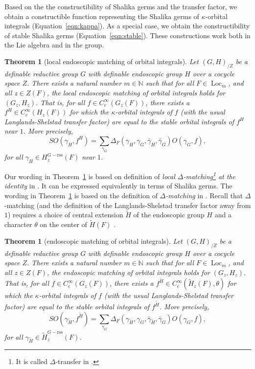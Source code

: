 \documentclass[12pt]{amsart}
\newcommand{\op}[1]{\operatorname{#1}}
\newcommand{\ring}[1]{{\mathbb #1}}
\newcommand{\reg}{\mathrm{rss}}
\theoremstyle{plain}
\newtheorem{theorem}[thm]{Theorem}
\theoremstyle{definition}
\begin{document}
Based on the the constructibility of Shalika germs and the transfer
factor, we obtain a constructible function representing the Shalika
germs of $\kappa$-orbital integrals (Equation~\ref{eqn:kappa}).  As a
special case, we obtain the constructibility of stable Shalika germs
(Equation~\ref{eqn:stable}).  These constructions work both in the Lie
algebra and in the group.

\begin{theorem}[local endoscopic matching of orbital integrals]\label{thm:local}
  Let $(G,H)_{/Z}$ be a definable reductive group $G$ with definable
  endoscopic group $H$ over a cocycle space $Z$.  There exists a
  natural number $m\in \ring{N}$ such that for all $F\in
  \op{Loc}_{m}$, and all $z\in Z(F)$, the local endoscopic matching of
  orbital integrals holds for $(G_z,H_z)$.  That is, for all $f\in
  C_c^\infty(G_z(F))$, there exists a $f^H\in C_c^\infty(H_z(F))$ for
  which the $\kappa$-orbital integrals of $f$ (with the usual
  Langlands-Shelstad transfer factor) are equal to the stable orbital
  integrals of $f^H$ near $1$. More precisely,
\[
SO(\gamma_H,f^H) = \sum_{\gamma_G} \Delta_F(\gamma_H,\gamma_G,\bar
\gamma_H,\bar \gamma_G) O(\gamma_G,f),
\]
for all $\gamma_H\in H^{G-\reg}_z(F)$ near $1$.
\end{theorem}

Our wording in Theorem~\ref{thm:local} is based on definition of {\it
  local $\Delta$-matching\footnote{It is called $\Delta$-transfer in
    \cite{LSd}.} at the identity} in \cite{LSd}.  It can be
expressed equivalently in terms of Shalika germs.  The wording in
Theorem~\ref{thm:xfer} is based on the definition of {\it
  $\Delta$-matching} in \cite{LSd}.  Recall that $\Delta$-matching
(and the definition of the Langlands-Shelstad transfer factor away
from $1$) requires a choice of central extension $\tilde H$ of the
endoscopic group $H$ and a character $\theta$ on the center of
$\tilde H(F)$ \cite[Sec.4.4]{LSxf}.

\begin{theorem}[endoscopic matching of orbital integrals]\label{thm:xfer}
  Let $(G,H)_{/Z}$ be a definable reductive group $G$ with definable
  endoscopic group $H$ over a cocycle space $Z$.  There exists a
  natural number $m\in \ring{N}$ such that for all $F\in
  \op{Loc}_{m}$, and all $z\in Z(F)$, the endoscopic matching of
  orbital integrals holds for $(G_z,H_z)$.  That is, for all $f\in
  C_c^\infty(G_z(F))$, there exists a $f^{\tilde H}\in
  C_c^\infty(\tilde H_z(F),\theta)$ for which the $\kappa$-orbital
  integrals of $f$ (with the usual Langlands-Shelstad transfer factor)
  are equal to the stable orbital integrals of $f^{\tilde H}$. More
  precisely,
\[
SO(\gamma_{\tilde H},f^{\tilde H}) = \sum_{\gamma_G}
\Delta_F(\gamma_{\tilde H},\gamma_G,\bar
\gamma_{\tilde H},\bar \gamma_G) O(\gamma_G,f),
\]
for all $\gamma_{\tilde H}\in {\tilde H}^{G-\reg}_z(F)$.
\end{theorem}
\end{document}
